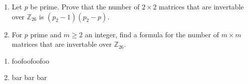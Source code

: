\begin{statement}{1.12}
  \begin{enumerate}[label=(\alph*)]
  \item Let $p$ be prime. Prove that the number of $2 \times 2$ matrices that are invertable over $\mathbb{Z}_{26}$ is $(p_2 - 1)(p_2 - p)$.

    \item For $p$ prime and $m \ge 2$ an integer, find a formula for the number of $m \times m$ matrices that are invertable over $\mathbb{Z}_{26}$.
  \end{enumerate}
\end{statement}

  \begin{enumerate}[label=(\alph*)]

  \item foofoofoofoo

  \item bar bar bar
    \end{enumerate}

